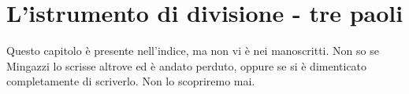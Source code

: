 \documentclass[10pt]{memoir} %
\begin{document}

\chapter{L'istrumento di divisione - tre paoli}

Questo capitolo è presente nell'indice, ma non vi è nei manoscritti. Non so se Mingazzi lo scrisse altrove ed è andato perduto, oppure se si è dimenticato completamente di scriverlo. Non lo scopriremo mai.

\end{document}
